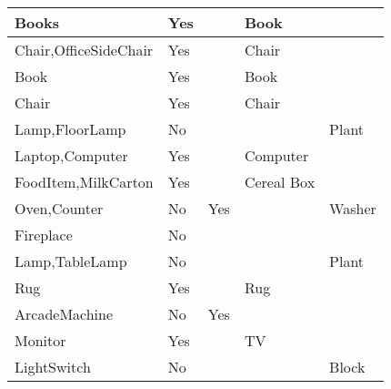 \documentclass{article}
\begin{document}
\begin{longtable}{|l|l|l|l|l|}
Books                                    & Yes              &                                & Book           &                             \\ \hline
Chair,OfficeSideChair                    & Yes              &                                & Chair          &                             \\ \hline
Book                                     & Yes              &                                & Book           &                             \\ \hline
Chair                                    & Yes              &                                & Chair          &                             \\ \hline
Lamp,FloorLamp                           & No               &                                &                & Plant                       \\ \hline
Laptop,Computer                          & Yes              &                                & Computer       &                             \\ \hline
FoodItem,MilkCarton                      & Yes              &                                & Cereal Box     &                             \\ \hline
Oven,Counter                             & No               & Yes                            &                & Washer                      \\ \hline
Fireplace                                & No               &                                &                &                             \\ \hline
Lamp,TableLamp                           & No               &                                &                & Plant                       \\ \hline
Rug                                      & Yes              &                                & Rug            &                             \\ \hline
ArcadeMachine                            & No               & Yes                            &                &                             \\ \hline
Monitor                                  & Yes              &                                & TV             &                             \\ \hline
LightSwitch                              & No               &                                &                & Block                       \\ \hline

\end{longtable}
\end{document}
